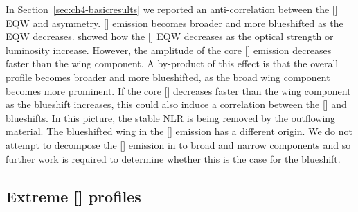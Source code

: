 In Section~\ref{sec:ch4-basicresults} we reported an anti-correlation between the [] EQW and asymmetry. 
[] emission becomes broader and more blueshifted as the EQW decreases.
\citet{shen14} showed how the [] EQW decreases as the optical  strength or luminosity increase. 
However, the amplitude of the core [] emission decreases faster than the wing component.
A by-product of this effect is that the overall profile becomes broader and more blueshifted, as the broad wing component becomes more prominent. 
If the core [] decreases faster than the wing component as the  blueshift increases, this could also induce a correlation between the [] and  blueshifts.  
In this picture, the stable NLR is being removed by the outflowing material.
The blueshifted wing in the [] emission has a different origin.  
We do not attempt to decompose the [] emission in to broad and narrow components and so further work is required to determine whether this is the case for the  blueshift. 

\subsection{Extreme [] profiles}
\label{sec:extreme_oiii}

